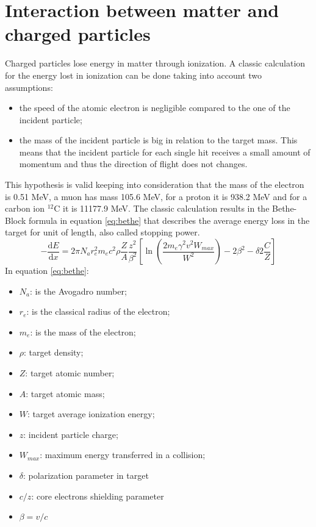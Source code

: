 \section{Interaction between matter and charged particles}
Charged particles
lose energy in matter through ionization.
A classic calculation for the energy lost in ionization can be done taking into account two assumptions:
\begin{itemize}
	\item the speed of the atomic electron is negligible compared to the one of the incident particle;
	\item the mass of the incident particle is big in relation to the target mass. This means that the incident particle for each single hit receives a small amount of momentum and thus the direction of flight does not changes.  
\end{itemize}
\noindent This hypothesis is valid keeping into consideration that the mass of the electron is 0.51 MeV, a muon has mass 105.6 MeV, for a proton it is 938.2 MeV and for a carbon ion ${}^{12}$C it is 11177.9 MeV.
\newline
The classic calculation results in the Bethe-Block formula in equation \ref{eq:bethe} that describes the average energy loss in the target for unit of length, also called stopping power.
\begin{equation}\label{eq:bethe}
	-\dfrac{\mathrm dE}{\mathrm dx} = 2 \pi N_{a} r_{e}^{2} m_{e} c^{2} \rho \dfrac{Z}{A}  \dfrac{z^{2}}{\beta^{2}}\left[\ln\left(\dfrac{2m_{e} \gamma ^{2} v^{2} W_{max}}{W^{2}}\right) - 2\beta^{2} - \delta 2\frac{C}{Z}\right]
\end{equation}
\noindent In equation \ref{eq:bethe}:
\begin{itemize}
	\item $N_a$: is the Avogadro number;
	\item $r_e$: is the classical radius of the electron;
	\item $m_e$: is the mass of the electron;
	\item $\rho$: target density;
	\item $Z $: target atomic number;
	\item $A $: target atomic mass;
	\item $W $: target average ionization energy;
	\item $z $: incident particle charge;
	\item $W_{max} $: maximum energy transferred in a collision; 
	\item $\delta $: polarization parameter in target
	\item $c/z $: core electrons shielding parameter 
	\item $\beta = v/c $
\end{itemize}

